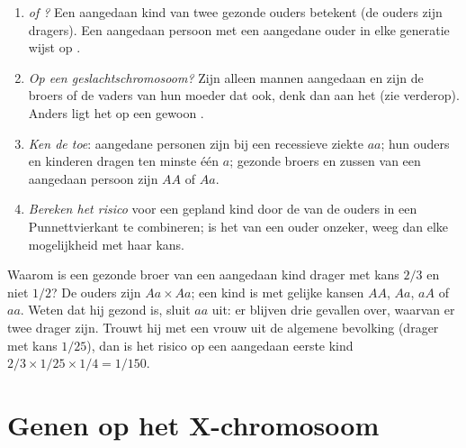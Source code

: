 \begin{method}\label{met:g11:genes-and-disease:analyse}
\begin{enumerate}
  \item \emph{ of ?} Een aangedaan kind van twee gezonde
        ouders betekent  (de ouders zijn dragers). Een aangedaan
        persoon met een aangedane ouder in elke generatie wijst op
        .
  \item \emph{Op een geslachtschromosoom?} Zijn alleen mannen aangedaan
        en zijn de broers of de vaders van hun moeder dat ook, denk dan
        aan het  (zie verderop). Anders ligt het  op een
        gewoon .
  \item \emph{Ken de  toe}: aangedane personen zijn bij een
        recessieve ziekte $aa$; hun ouders en kinderen dragen ten minste
        één $a$; gezonde broers en zussen van een aangedaan persoon zijn
        $AA$ of $Aa$.
  \item \emph{Bereken het risico} voor een gepland kind door de
         van de ouders in een Punnettvierkant te combineren;
        is het  van een ouder onzeker, weeg dan elke
        mogelijkheid met haar kans.
\end{enumerate}
\end{method}

\begin{example}\label{ex:g11:genes-and-disease:twothirds}
Waarom is een gezonde broer van een aangedaan kind drager met kans $2/3$
en niet $1/2$? De ouders zijn $Aa \times Aa$; een kind is met gelijke
kansen $AA$, $Aa$, $aA$ of $aa$. Weten dat hij gezond is, sluit $aa$ uit:
er blijven drie gevallen over, waarvan er twee drager zijn. Trouwt hij
met een vrouw uit de algemene bevolking (drager met kans $1/25$), dan is
het risico op een aangedaan eerste kind
$2/3 \times 1/25 \times 1/4 = 1/150$.
\end{example}

\section{Genen op het X-chromosoom}

